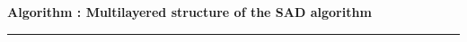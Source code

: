 \documentclass[12pt]{article}
\begin{document}
\par\medskip
{}
\noindent\textbf{Algorithm \thealgorithm: Multilayered structure of the SAD
algorithm}\label{algo:multilayer}
\par\smallskip\hrule\smallskip
\begingroup\scriptsize
%
%
%
%
\end{document}
